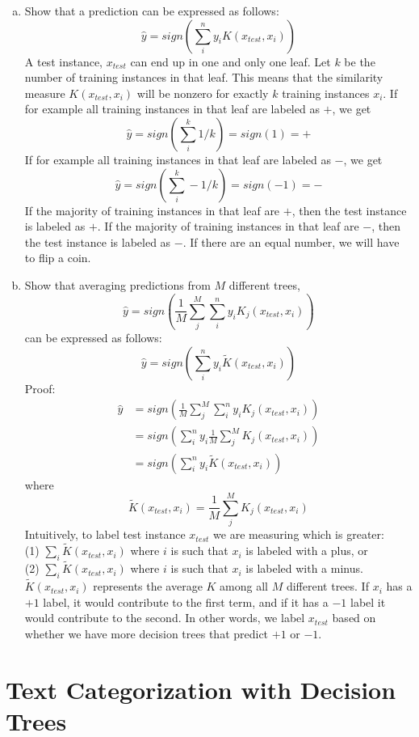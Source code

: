 \documentclass{article}
\begin{document}
\begin{enumerate}[(a)]
\item Show that a prediction can be expressed as follows:
\[\hat{y} = sign\left(\sum_i^n y_i K ( x_{test} , x_i )\right)\]
A test instance, $x_{test}$ can end up in one and only one leaf. Let $k$ be the number of training instances in that leaf. This means that the similarity measure $K(x_{test},x_i)$ will be nonzero for exactly $k$ training instances $x_i$. If for example all training instances in that leaf are labeled as $+$, we get
\[\hat{y} = sign\left(\sum_i^k 1/k \right)=sign(1)=+\]
If for example all training instances in that leaf are labeled as $-$, we get
\[\hat{y} = sign\left(\sum_i^k -1/k \right)=sign(-1)=-\]
If the majority of training instances in that leaf are $+$, then the test instance is labeled as $+$. If the majority of training instances in that leaf are $-$, then the test instance is labeled as $-$. If there are an equal number, we will have to flip a coin.
\item Show that averaging predictions from $M$ different trees,
\[\hat{y} = sign\left(\frac{1}{M}\sum_j^M\sum_i^n y_i K_j ( x_{test} , x_i )\right)\]
can be expressed as follows:
\[\hat{y} = sign\left(\sum_i^n y_i \tilde{K} ( x_{test} , x_i )\right)\]
Proof:
\begin{align*}
\hat{y} &= sign\left(\frac{1}{M}\sum_j^M\sum_i^n y_i K_j ( x_{test} , x_i )\right)\\
&=  sign\left(\sum_i^n y_i \frac{1}{M}\sum_j^M K_j ( x_{test} , x_i )\right)\\
&= sign\left(\sum_i^n y_i \tilde{K} ( x_{test} , x_i )\right)
\end{align*}
where
\[\tilde{K}( x_{test} , x_i )=\frac{1}{M}\sum_j^M K_j ( x_{test} , x_i )\]
Intuitively, to label test instance $x_{test}$ we are measuring which is greater: \\
(1) $\sum_i \tilde{K}( x_{test} , x_i )$ where $i$ is such that $x_i$ is labeled with a plus, or \\
(2) $\sum_i \tilde{K}( x_{test} , x_i )$ where $i$ is such that $x_i$ is labeled with a minus. \\$\tilde{K}( x_{test} , x_i )$ represents the average $K$ among all $M$ different trees. If $x_i$ has a $+1$ label, it would contribute to the first term, and if it has a $-1$ label it would contribute to the second. In other words, we label $x_{test}$ based on whether we have more decision trees that predict $+1$ or $-1$.
\end{enumerate}
\section{Text Categorization with Decision Trees}
\end{document}
